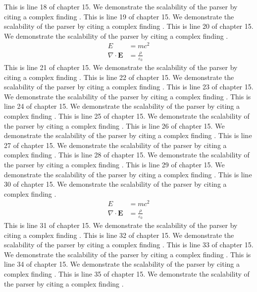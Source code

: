 This is line 18 of chapter 15. We demonstrate the scalability of the parser by citing a complex finding \cite{ref15_18}.
This is line 19 of chapter 15. We demonstrate the scalability of the parser by citing a complex finding \cite{ref15_19}.
This is line 20 of chapter 15. We demonstrate the scalability of the parser by citing a complex finding \cite{ref15_20}.
\begin{align*}
  E &= mc^2 \\
  \nabla \cdot \mathbf{E} &= \frac{\rho}{\varepsilon_0}
\end{align*}
This is line 21 of chapter 15. We demonstrate the scalability of the parser by citing a complex finding \cite{ref15_21}.
This is line 22 of chapter 15. We demonstrate the scalability of the parser by citing a complex finding \cite{ref15_22}.
This is line 23 of chapter 15. We demonstrate the scalability of the parser by citing a complex finding \cite{ref15_23}.
This is line 24 of chapter 15. We demonstrate the scalability of the parser by citing a complex finding \cite{ref15_24}.
This is line 25 of chapter 15. We demonstrate the scalability of the parser by citing a complex finding \cite{ref15_25}.
This is line 26 of chapter 15. We demonstrate the scalability of the parser by citing a complex finding \cite{ref15_26}.
This is line 27 of chapter 15. We demonstrate the scalability of the parser by citing a complex finding \cite{ref15_27}.
This is line 28 of chapter 15. We demonstrate the scalability of the parser by citing a complex finding \cite{ref15_28}.
This is line 29 of chapter 15. We demonstrate the scalability of the parser by citing a complex finding \cite{ref15_29}.
This is line 30 of chapter 15. We demonstrate the scalability of the parser by citing a complex finding \cite{ref15_30}.
\begin{align*}
  E &= mc^2 \\
  \nabla \cdot \mathbf{E} &= \frac{\rho}{\varepsilon_0}
\end{align*}
This is line 31 of chapter 15. We demonstrate the scalability of the parser by citing a complex finding \cite{ref15_31}.
This is line 32 of chapter 15. We demonstrate the scalability of the parser by citing a complex finding \cite{ref15_32}.
This is line 33 of chapter 15. We demonstrate the scalability of the parser by citing a complex finding \cite{ref15_33}.
This is line 34 of chapter 15. We demonstrate the scalability of the parser by citing a complex finding \cite{ref15_34}.
This is line 35 of chapter 15. We demonstrate the scalability of the parser by citing a complex finding \cite{ref15_35}.
